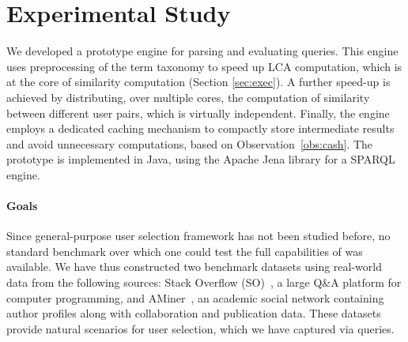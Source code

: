 


\section{Experimental Study}
\label{sec:Implementation} We developed a prototype engine for
parsing and evaluating \qlang{} queries. This engine uses preprocessing of the term taxonomy to speed up LCA computation, which is at the core of similarity computation (Section \ref{sec:exec}). A further speed-up is achieved by distributing, over multiple cores, the computation of similarity between different user pairs, which is virtually independent. Finally, the engine employs a dedicated caching mechanism to compactly store intermediate results and avoid unnecessary computations, based on Observation~\ref{obs:cash}.
The prototype is implemented in Java, using
the Apache Jena library \cite{jena} for 
 a SPARQL engine. %


\paragraph*{Goals}
Since general-purpose user selection framework has not been studied before, no standard benchmark over which one could test the full capabilities of \qlang{} was available. We have thus constructed two benchmark datasets using real-world data from the following sources: Stack
Overflow (SO)~\cite{StackOverflow}, a large Q\&A platform
for computer programming, and AMiner~\cite{tang2008arnetminer}, an
academic social network containing author profiles along with collaboration
and publication data. These datasets provide natural scenarios for user selection, which we have captured via \qlang{} queries.



